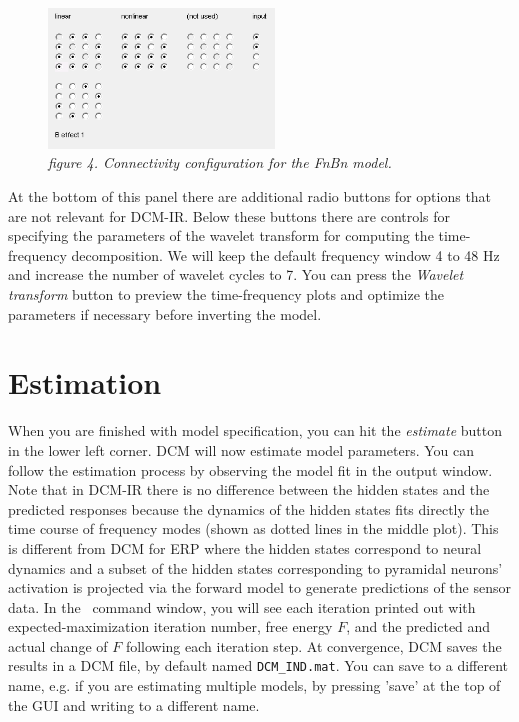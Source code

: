 \begin{figure}
\begin{center}
\includegraphics[width=60mm]{dcm_ir/figures/figure4}
\caption{\em  figure 4. Connectivity configuration for the FnBn model.\label{dcm-ir:fig:4}}
\end{center}
\end{figure}

At the bottom of this panel there are additional radio buttons for options that are not relevant for DCM-IR. Below these buttons there are controls for specifying the parameters of the wavelet transform for computing the time-frequency decomposition. We will keep the default frequency window 4 to 48 Hz and increase the number of wavelet cycles to 7. You can press the \textit{Wavelet transform} button to preview the time-frequency plots and optimize the parameters if necessary before inverting the model.  


\section{Estimation}
When you are finished with model specification, you can hit the \textit{estimate} button in the lower left corner. DCM will now estimate model parameters. You can follow the estimation process by observing the model fit in the output window. Note that in DCM-IR there is no difference between the hidden states and the predicted responses because the dynamics of the hidden states fits directly the time course of frequency modes (shown as dotted lines in the middle plot). This is different from DCM for ERP where the hidden states correspond to neural dynamics and a subset of the hidden states corresponding to pyramidal neurons' activation is projected via the forward model to generate predictions of the sensor data. In the \matlab\ command window, you will see each iteration printed out with expected-maximization iteration number, free energy $F$, and the predicted and actual change of $F$ following each iteration step. At convergence, DCM saves the results in a DCM file, by default named \texttt{DCM\_IND.mat}. You can save to a different name, e.g. if you are estimating multiple models, by pressing 'save' at the top of the GUI and writing to a different name.

